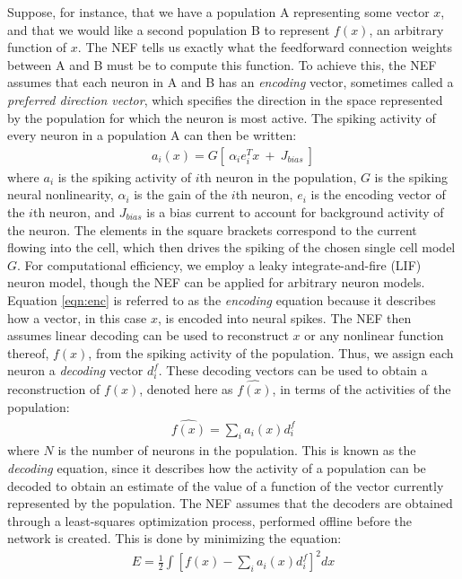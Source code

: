 \documentclass[10pt,letterpaper]{article}
\begin{document}
Suppose, for instance, that we have a population A representing some vector $x$, and that we would like a second population B to represent $f(x)$, an arbitrary function of $x$. The NEF tells us exactly what the feedforward connection weights between A and B must be to compute this function. To achieve this, the NEF assumes that each neuron in A and B has an \textit{encoding} vector, sometimes called a \textit{preferred direction vector}, which specifies the direction in the space represented by the population for which the neuron is most active. The spiking activity of every neuron in a population A can then be written:
\begin{align}
a_i (x) = G [\ \alpha_i e_i^T x\ +\ J_{bias}\ ]\label{eqn:enc}
\end{align}
where $a_i$ is the spiking activity of $i$th neuron in the population, $G$ is the spiking neural nonlinearity, $\alpha_i$ is the gain of the $i$th neuron, $e_i$ is the encoding vector of the $i$th neuron, and $J_{bias}$ is a bias current to account for background activity of the neuron. The elements in the square brackets correspond to the current flowing into the cell, which then drives the spiking of the chosen single cell model $G$. For computational efficiency, we employ a leaky integrate-and-fire (LIF) neuron model, though the NEF can be applied for arbitrary neuron models. Equation \eqref{eqn:enc} is referred to as the \textit{encoding} equation because it describes how a vector, in this case $x$, is encoded into neural spikes. The NEF then assumes linear decoding can be used to reconstruct $x$ or any nonlinear function thereof, $f(x)$, from the spiking activity of the population. Thus, we assign each neuron a
\textit{decoding} vector $d^f_i$. These decoding vectors can be used to obtain a reconstruction of $f(x)$, denoted here as $\widehat{f(x)}$, in terms of the activities of the population:
\begin{align}
\widehat{f(x)} = \sum_i a_i(x) d^f_i \label{eqn:dec}
\end{align}
where $N$ is the number of neurons in the population. This is known as the \textit{decoding} equation, since it describes how the activity of a population can be decoded to obtain an estimate of the value of a function of the vector currently represented by the population. The NEF assumes that the decoders are obtained through a least-squares optimization process, performed offline before the network is created. This is done by minimizing the equation:
\begin{align}
E = \frac{1}{2}\int[f(x) - \sum_i a_i(x) d^f_i]^2dx\label{eqn:error}
\end{align}
\end{document}
